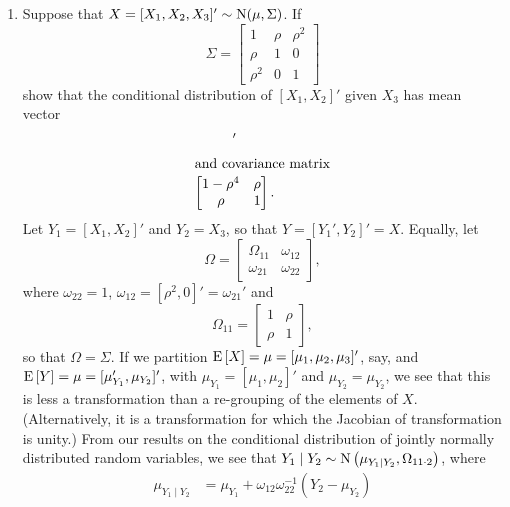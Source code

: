\begin{enumerate}
   \item Suppose that \( X=[X_{1},X_{2},X_{3}]'\sim\operatorname{N}(\mu,\Sigma) \).  If 
         \[ 
            \Sigma=
            \begin{bmatrix}
               1 & \rho & \rho^{2} \\
               \rho & 1 & 0 \\
               \rho^{2} & 0 & 1
            \end{bmatrix}
         \]
         show that the conditional distribution of \( [X_{1},X_{2}]' \) given \( X_{3} \) has mean 
         vector 
         \begin{gather*}
            [\mu_{1}+\rho^{2}(x_{3}-\mu_{3}),\mu_{2}]' \\
            \intertext{and covariance matrix}
            \begin{bmatrix}
               1-\rho^{4} & \rho \\
               \rho & 1
            \end{bmatrix}.
         \end{gather*}
         \solution 
         Let \( Y_{1}=[X_{1},X_{2}]' \) and \( Y_{2}=X_{3} \), so that \( Y=[Y_{1}',Y_{2}]'=X \).
         Equally, let
         \[ 
            \Omega=
            \begin{bmatrix}
               \Omega_{11} & \omega_{12} \\
               \omega_{21} & \omega_{22}
            \end{bmatrix},
         \]
         where \( \omega_{22}=1 \), \( \omega_{12}=[\rho^{2},0]'=\omega_{21}' \) and
         \[ 
            \Omega_{11}=\begin{bmatrix} 1 & \rho \\ \rho & 1 \end{bmatrix},
         \] 
         so that \( \Omega=\Sigma \).  If we partition \( \operatorname{E}\left[X\right]=\mu=[\mu_{1},\mu_{2},\mu_{3}]' \),
         say, and \( \operatorname{E}\left[Y\right]=\mu=[\mu_{Y_{1}}',\mu_{Y_{2}}]' \), with \( \mu_{Y_{1}}=[\mu_{1},\mu_{2}]'
         \) and \( \mu_{Y_{2}}=\mu_{Y_{2}} \), we see that this is less a transformation than a
         re-grouping of the elements of \( X \).  (Alternatively, it is a transformation for which
         the Jacobian of transformation is unity.)  From our results on the conditional distribution
         of jointly normally distributed random variables, we see that \( Y_{1}\mid
         Y_{2}\sim\operatorname{N}\left(\mu_{Y_{1}\mid Y_{2}}, \Omega_{11\cdot 2}\right) \), where
         \begin{align*}
            \mu_{Y_{1}\mid Y_{2}} & =\mu_{Y_{1}}+\omega_{12}\omega_{22}^{-1}(Y_{2}-\mu_{Y_{2}})

\end{align*}
\end{enumerate}
